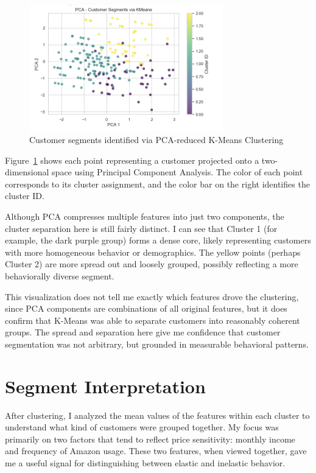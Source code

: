 \documentclass[12pt]{article}
\begin{document}
\begin{figure}[h!]
  \centering
  \includegraphics[width=0.75\textwidth]{figures/pca customer segments via kmeans.png}
  \caption{Customer segments identified via PCA-reduced K-Means Clustering}
  \label{fig:pca-clusters}
\end{figure}

Figure~\ref{fig:pca-clusters} shows each point representing a customer projected onto a two-dimensional space using Principal Component Analysis. The color of each point corresponds to its cluster assignment, and the color bar on the right identifies the cluster ID.

Although PCA compresses multiple features into just two components, the cluster separation here is still fairly distinct. I can see that Cluster 1 (for example, the dark purple group) forms a dense core, likely representing customers with more homogeneous behavior or demographics. The yellow points (perhaps Cluster 2) are more spread out and loosely grouped, possibly reflecting a more behaviorally diverse segment.

This visualization does not tell me exactly which features drove the clustering, since PCA components are combinations of all original features, but it does confirm that K-Means was able to separate customers into reasonably coherent groups. The spread and separation here give me confidence that customer segmentation was not arbitrary, but grounded in measurable behavioral patterns.


\section{Segment Interpretation}

After clustering, I analyzed the mean values of the features within each cluster to understand what kind of customers were grouped together. My focus was primarily on two factors that tend to reflect price sensitivity: monthly income and frequency of Amazon usage. These two features, when viewed together, gave me a useful signal for distinguishing between elastic and inelastic behavior.
\end{document}
